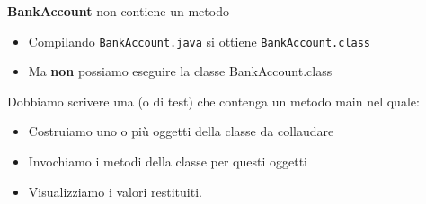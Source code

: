\begin{frame}
\begin{block}{}
\textbf{BankAccount} non contiene un metodo \textbf{}
\begin{itemize}
\item Compilando \texttt{BankAccount.java} si ottiene \texttt{BankAccount.class}
\item Ma \textbf{non } possiamo eseguire la classe BankAccount.class
\end{itemize}
\end{block}
\begin{block}{}
Dobbiamo scrivere una \textbf{} (o di test) che contenga un metodo main nel quale:
\begin{itemize}
\item Costruiamo uno o più oggetti della classe da collaudare
\item Invochiamo i metodi della classe per questi oggetti
\item Visualizziamo i valori restituiti.
\end{itemize}
\end{block}
\end{frame}
